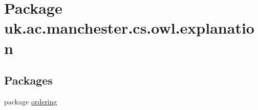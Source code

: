 \hypertarget{namespaceuk_1_1ac_1_1manchester_1_1cs_1_1owl_1_1explanation}{\section{Package uk.\-ac.\-manchester.\-cs.\-owl.\-explanation}
\label{namespaceuk_1_1ac_1_1manchester_1_1cs_1_1owl_1_1explanation}
}
\subsection*{Packages}
\begin{DoxyCompactItemize}
\item 
package \hyperlink{namespaceuk_1_1ac_1_1manchester_1_1cs_1_1owl_1_1explanation_1_1ordering}{ordering}
\end{DoxyCompactItemize}
